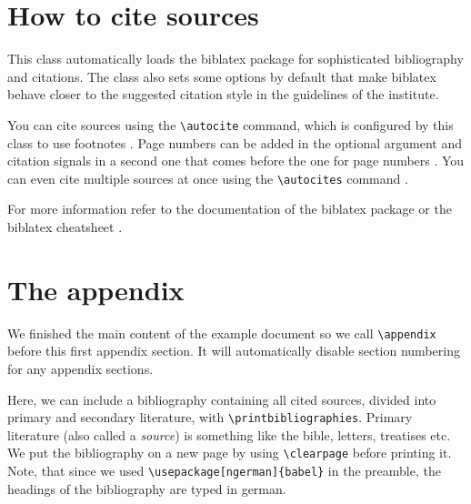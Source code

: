 \documentclass{rub-kunstgeschichte}
\begin{document}
    \section{How to cite sources}
    This class automatically loads the \textsf{biblatex} package for sophisticated bibliography and citations.
    The class also sets some options by default that make \textsf{biblatex} behave closer to the suggested citation style in the guidelines of the institute.

    You can cite sources using the \verb|\autocite| command, which is configured by this class to use footnotes \autocite{exampleArticle}.
    Page numbers can be added in the optional argument \autocite[394]{exampleBook} and citation signals in a second one that comes before the one for page numbers \autocite[see][]{exampleWebsite}.
    You can even cite multiple sources at once using the \verb|\autocites| command \autocites[111]{exampleBook}[see also][13]{exampleArticle}.

    For more information refer to the documentation of the \textsf{biblatex} package \autocite{biblatexDocs} or the biblatex cheatsheet \autocite{biblatexCheatsheet}.

    \clearpage
    \appendix

    \section{The appendix}
    We finished the main content of the example document so we call \verb|\appendix| before this first appendix section.
    It will automatically disable section numbering for any appendix sections.

    Here, we can include a bibliography containing all cited sources, divided into primary and secondary literature, with \verb|\printbibliographies|.
    Primary literature (also called a \textit{source}) is something like the bible\autocite{bible}, letters, treatises etc.
    We put the bibliography on a new page by using \verb|\clearpage| before printing it.
    Note, that since we used \verb|\usepackage[ngerman]{babel}| in the preamble, the headings of the bibliography are typed in german.

    \clearpage
    \printbibliographies%
\end{document}
